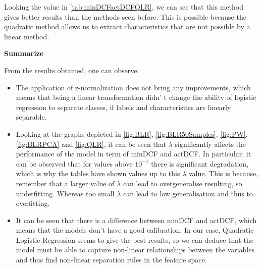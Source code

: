 Looking the value in \autoref{tab:minDCFactDCFQLR}, we can see that this method gives better results than the methods
seen before.
This is possible because the quadratic method allows us to extract characteristics that are not possible by a linear method.

\bigskip
\textbf{Summarize}\par
From the results obtained, one can observe:
\begin{itemize}
    \item The application of z-normalization does not bring any improvements, which means that being a linear transformation
    didn' t change the ability of logistic regression to separate classes, if labels and characteristics are linearly separable.
    \item Looking at the graphs depicted in \autoref{fig:BLR}, \autoref{fig:BLR50Samples}, \autoref{fig:PW}, \autoref{fig:BLRPCA} and \autoref{fig:QLR},
    it can be seen that \(\lambda\) significantly affects the performance of the model in term of minDCF and actDCF.
    In particular, it can be observed that for values above \(10^{-1}\) there is significant degradation, which is why
    the tables have shown values up to this \(\lambda\) value.
    This is because, remember that a larger value of \(\lambda\) can lead to overgeneralise resulting, so underfitting.
    Whereas too small \(\lambda\) can lead to low generalisation and thus to overfitting.
    \item It can be seen that there is a difference between minDCF and actDCF, which means that the models don't have a good calibration.
    In our case, Quadratic Logistic Regression seems to give the best results, so we can deduce that the model must be able
    to capture non-linear relationships between the variables and thus find non-linear separation rules in the feature space.

\end{itemize}